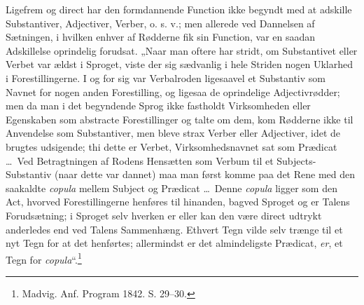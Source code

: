 \documentclass[12pt]{book}
\newcommand{\opage}[1]{\marginnote{\footnotesize\textit{[#1]}}}
\begin{document}
\opage{36}Ligefrem og direct har den formdannende Function ikke
begyndt med at adskille Substantiver, Adjectiver, Verber, o. s. v.;
men allerede ved Dannelsen af Sætningen, i hvilken enhver af
Rødderne fik sin Function, var en saadan Adskillelse oprindelig
forudsat. „Naar man oftere har stridt, om Substantivet
eller Verbet var ældst i Sproget, viste der sig sædvanlig i
hele Striden nogen Uklarhed i Forestillingerne. I og for sig
var Verbalroden ligesaavel et Substantiv som Navnet for
nogen anden Forestilling, og ligesaa de oprindelige Adjectivrødder;
men da man i det begyndende Sprog ikke fastholdt
Virksomheden eller Egenskaben som abstracte Forestillinger og
talte om dem, kom Rødderne ikke til Anvendelse som Substantiver,
men bleve strax Verber eller Adjectiver, idet de
brugtes udsigende; thi dette er Verbet, Virksomhedsnavnet sat
som Prædicat \ldots\ Ved Betragtningen af Rodens Hensætten
som Verbum til et Subjects-Substantiv (naar dette var dannet)
maa man først komme paa det Rene med den saakaldte \textit{copula}
mellem Subject og Prædicat \ldots\ Denne \textit{copula} ligger som
den Act, hvorved Forestillingerne henføres til hinanden, bagved
Sproget og er Talens Forudsætning; i Sproget selv hverken
er eller kan den være direct udtrykt anderledes end ved
Talens Sammenhæng. Ethvert Tegn vilde selv trænge til et
nyt Tegn for at det henførtes; allermindst er det almindeligste
Prædicat, \emph{er}, et Tegn for \textit{copula}“.\footnote{%
Madvig. Anf. Program 1842. S. 29--30.}
\end{document}
